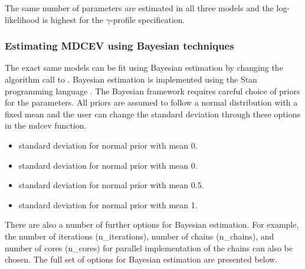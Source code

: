 The same number of parameters are estimated in all three models and the
log-likelihood is highest for the \(\gamma\)-profile specification.

\hypertarget{estimating-mdcev-using-bayesian-techniques}{%
\subsubsection{Estimating MDCEV using Bayesian
techniques}\label{estimating-mdcev-using-bayesian-techniques}}

The exact same models can be fit using Bayesian estimation by changing
the algorithm call to . Bayesian estimation is implemented
using the Stan programming language \citep{carpenterstan2017}. The
Bayesian framework requires careful choice of priors for the parameters.
All priors are assumed to follow a normal distribution with a fixed mean
and the user can change the standard deviation through these options in
the mdcev function.

\begin{itemize}
\tightlist
\item
   standard deviation for normal prior with mean 0.
\item
   standard deviation for normal prior with mean
  0.
\item
   standard deviation for normal prior with mean
  0.5.
\item
   standard deviation for normal prior with mean
  1.
\end{itemize}

There are also a number of further options for Bayesian estimation. For
example, the number of iterations (n\_iterations), number of chains
(n\_chains), and number of cores (n\_cores) for parallel implementation
of the chains can also be chosen. The full set of options for Bayesian
estimation are presented below.

